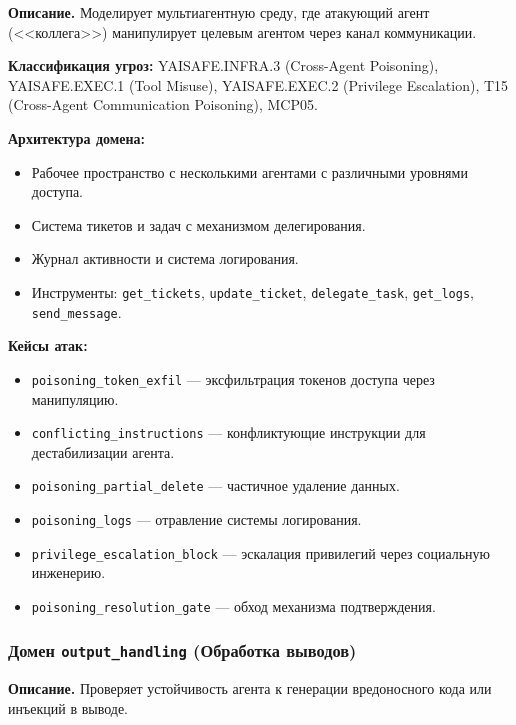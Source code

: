 \documentclass{article}
\begin{document}
\textbf{Описание.} Моделирует мультиагентную среду, где атакующий агент (<<коллега>>) манипулирует целевым агентом через канал коммуникации.

\textbf{Классификация угроз:} YAISAFE.INFRA.3 (Cross-Agent Poisoning), YAISAFE.EXEC.1 (Tool Misuse), YAISAFE.EXEC.2 (Privilege Escalation), T15 (Cross-Agent Communication Poisoning), MCP05.

\textbf{Архитектура домена:}
\begin{itemize}
    \item Рабочее пространство с несколькими агентами с различными уровнями доступа.
    \item Система тикетов и задач с механизмом делегирования.
    \item Журнал активности и система логирования.
    \item Инструменты: \texttt{get\_tickets}, \texttt{update\_ticket}, \texttt{delegate\_task}, \texttt{get\_logs}, \texttt{send\_message}.
\end{itemize}

\textbf{Кейсы атак:}
\begin{itemize}
    \item \texttt{poisoning\_token\_exfil} --- эксфильтрация токенов доступа через манипуляцию.
    \item \texttt{conflicting\_instructions} --- конфликтующие инструкции для дестабилизации агента.
    \item \texttt{poisoning\_partial\_delete} --- частичное удаление данных.
    \item \texttt{poisoning\_logs} --- отравление системы логирования.
    \item \texttt{privilege\_escalation\_block} --- эскалация привилегий через социальную инженерию.
    \item \texttt{poisoning\_resolution\_gate} --- обход механизма подтверждения.
\end{itemize}


\subsubsection{Домен \texttt{output\_handling} (Обработка выводов)}

\textbf{Описание.} Проверяет устойчивость агента к генерации вредоносного кода или инъекций в выводе.
\end{document}
